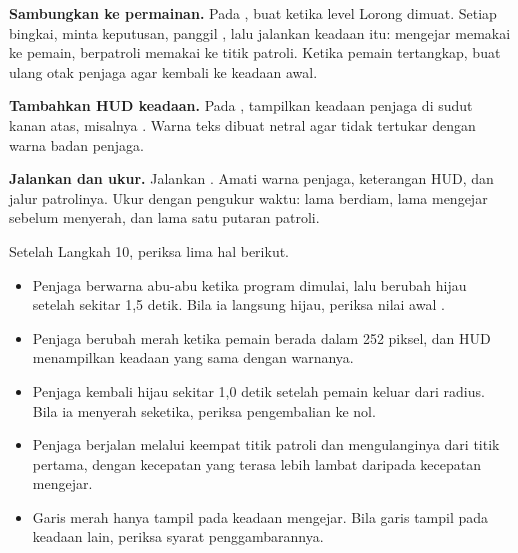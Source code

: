 \begin{langkah}
  \item \textbf{Sambungkan ke permainan.} Pada , buat
         ketika level Lorong dimuat. Setiap bingkai, minta
        keputusan, panggil , lalu jalankan keadaan itu: mengejar
        memakai  ke pemain, berpatroli memakai
         ke titik patroli. Ketika pemain tertangkap, buat ulang
        otak penjaga agar kembali ke keadaan awal.

  \item \textbf{Tambahkan HUD keadaan.} Pada , tampilkan
        keadaan penjaga di sudut kanan atas, misalnya
        . Warna teks dibuat netral agar tidak tertukar
        dengan warna badan penjaga.

  \item \textbf{Jalankan dan ukur.} Jalankan
        . Amati warna penjaga, keterangan HUD,
        dan jalur patrolinya. Ukur dengan pengukur waktu: lama berdiam, lama
        mengejar sebelum menyerah, dan lama satu putaran patroli.
\end{langkah}

\begin{ujibox}
Setelah Langkah 10, periksa lima hal berikut.
\begin{itemize}[leftmargin=1.4em, itemsep=0.2em]
  \item Penjaga berwarna abu-abu ketika program dimulai, lalu berubah hijau
        setelah sekitar 1,5 detik. Bila ia langsung hijau, periksa nilai awal
        .
  \item Penjaga berubah merah ketika pemain berada dalam 252 piksel, dan HUD
        menampilkan keadaan yang sama dengan warnanya.
  \item Penjaga kembali hijau sekitar 1,0 detik setelah pemain keluar dari
        radius. Bila ia menyerah seketika, periksa pengembalian
         ke nol.
  \item Penjaga berjalan melalui keempat titik patroli dan mengulanginya dari
        titik pertama, dengan kecepatan yang terasa lebih lambat daripada
        kecepatan mengejar.
  \item Garis merah hanya tampil pada keadaan mengejar. Bila garis tampil pada
        keadaan lain, periksa syarat penggambarannya.
\end{itemize}
\end{ujibox}


